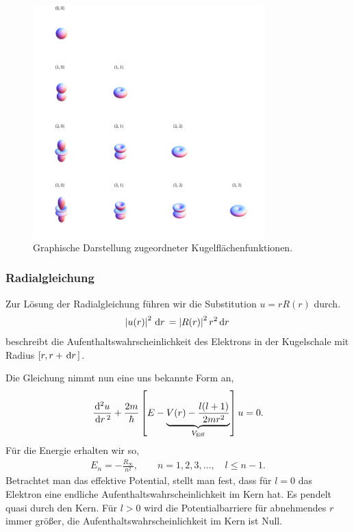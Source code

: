 \begin{figure}[!htbp]
	\centering
	\includegraphics[width=0.8\textwidth]{fig/3-Kugelflaechenfunktionen.png}
	\caption{Graphische Darstellung zugeordneter Kugelflächenfunktionen.}
\end{figure}



\subsubsection{Radialgleichung}

Zur Lösung der Radialgleichung führen wir die Substitution $u = rR(r)$
durch.
\begin{align*}
\left|u(r)\right|^2\,\mathrm{d} r\, = \left|R(r)\right|^2r^2\,\mathrm{d} r\,
\end{align*}
beschreibt die Aufenthaltswahrscheinlichkeit des Elektrons in der Kugelschale
mit Radius $[r,r+\,\mathrm{d} r\,]$.

Die Gleichung nimmt nun eine uns bekannte Form an,
\begin{align*}
\frac{\mathrm{d}^2u}{\,\mathrm{d} r\,^2} + \frac{2m}{\hbar}\left[E-\underbrace{V(r) -
\frac{l(l+1)}{2mr^2}}_{V_{\text{Eff}}}\right]u = 0.
\end{align*}
Für die Energie erhalten wir so,
\begin{align*}
E_n = -\frac{R_\infty}{n^2},\qquad n=1,2,3,\ldots,\quad l\le n-1.
\end{align*}
Betrachtet man das effektive Potential, stellt man fest, dass für $l=0$ das
Elektron eine endliche Aufenthaltswahrscheinlichkeit im Kern hat. Es pendelt
quasi durch den Kern. Für $l>0$ wird die Potentialbarriere für abnehmendes $r$
immer größer, die Aufenthaltswahrscheinlichkeit im Kern ist Null.

